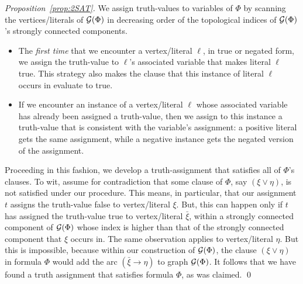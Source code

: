 \begin{proof}[Proposition~\ref{prop:2SAT}]
We assign truth-values to variables of $\Phi$ by scanning the
vertices/literals of $\mbox{$\cal G$}(\Phi)$ in decreasing order of the topological
indices of $\mbox{$\cal G$}(\Phi)$'s strongly connected components.
\begin{itemize}
\item
The {\em first time} that we encounter a vertex/literal $\ell$, in
true or negated form, we assign the truth-value to $\ell$'s associated
variable that makes literal $\ell$ {\sc true}.  This strategy also
makes the clause that this instance of literal $\ell$ occurs in
evaluate to {\sc true}.
\item
If we encounter an instance of a vertex/literal $\ell$ whose
associated variable has already been assigned a truth-value, then we
assign to this instance a truth-value that is consistent with the
variable's assignment: a positive literal gets the same assignment,
while a negative instance gets the negated version of the assignment.
\end{itemize}

Proceeding in this fashion, we develop a truth-assignment that
satisfies all of $\Phi$'s clauses.  To wit, assume for contradiction
that some clause of $\Phi$, say $(\xi \vee \eta)$, is not satisfied
under our procedure.  This means, in particular, that our assignment
$t$ assigns the truth-value {\sc false} to vertex/literal $\xi$.  But,
this can happen only if $t$ has assigned the truth-value {\sc true} to
vertex/literal $\bar{\xi}$, within a strongly connected component of
$\mbox{$\cal G$}(\Phi)$ whose index is higher than that of the strongly connected
component that $\xi$ occurs in.  The same observation applies to
vertex/literal $\eta$.  But this is impossible, because within our
construction of $\mbox{$\cal G$}(\Phi)$, the clause $(\xi \vee \eta)$ in formula
$\Phi$ would add the arc $(\bar{\xi} \rightarrow \eta)$ to graph
$\mbox{$\cal G$}(\Phi)$.  It follows that we have found a truth assignment that
satisfies formula $\Phi$, as was claimed.  \qed
\end{proof}

\medskip

